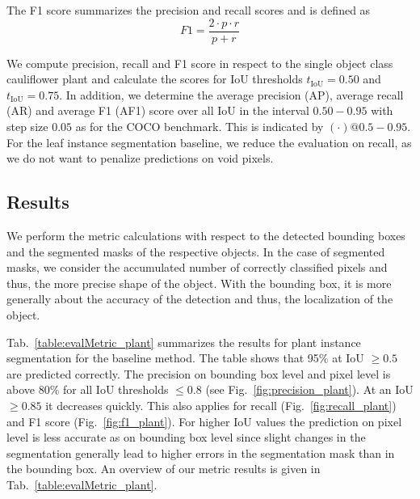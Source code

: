 \documentclass{article}
\def\figref#1{Fig.~\ref{#1}}
\def\tabref#1{Tab.~\ref{#1}}
\begin{document}
The F1 score summarizes the precision and recall scores %
and is defined as
\begin{equation}
    F1 = \frac{2 \cdot p \cdot r}{p + r}
\end{equation}


We compute precision, recall and F1 score in respect to the single object class cauliflower plant and calculate the scores for IoU thresholds $t_{\text{IoU}} = 0.50$ and $t_{\text{IoU}} = 0.75$. In addition, we determine the average precision (AP), average recall (AR) and average F1 (AF1) score over all IoU in the interval $0.50-0.95$ with step size $0.05$ as for the COCO benchmark. This is indicated by $(\cdot)@0.5-0.95$.
For the leaf instance segmentation baseline, we reduce the evaluation on recall, as we do not want to penalize predictions on void pixels.






\subsection{Results}

We perform the metric calculations with respect to the detected bounding boxes and the segmented masks of the respective objects. In the case of segmented masks, we consider the accumulated number of correctly classified pixels and thus, the more precise shape of the object. With the bounding box, it is more generally about the accuracy of the detection and thus, the localization of the object.

\tabref{table:evalMetric_plant} summarizes the results for plant instance segmentation for the baseline method. The table shows that 95\% at IoU $\geq 0.5$ are predicted correctly. The precision on bounding box level and pixel level is above 80\% for all IoU thresholds $\leq 0.8$ (see \figref{fig:precision_plant}). At an IoU $\geq 0.85$ it decreases quickly. This also applies for recall (\figref{fig:recall_plant}) and F1 score (\figref{fig:f1_plant}).
For higher IoU values the prediction on pixel level is less accurate as on bounding box level since slight changes in the segmentation generally lead to higher errors in the segmentation mask than in the bounding box.
An overview of our metric results is given in \tabref{table:evalMetric_plant}.
\end{document}
